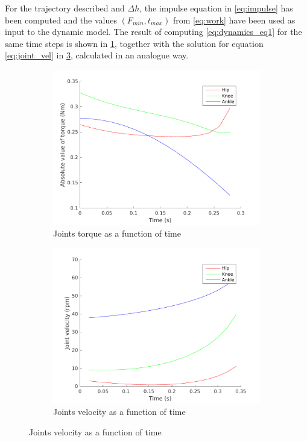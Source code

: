 For the trajectory described and $\Delta h$, the impulse equation in \ref{eq:impulse} has been computed and the values $(F_{min}, t_{max})$ from \ref{eq:work} have been used as input to the dynamic model.
The result of computing \ref{eq:dynamics_eq1} for the same time steps is shown in \ref{fig:controller_torque}, together with the solution for equation \ref{eq:joint_vel} in \ref{fig:controller_speed}, calculated in an analogue way.

\begin{figure}[h]
    \centering
    \begin{subfigure}{0.49\textwidth}
        \includegraphics[width=\textwidth]{figures/torque-time.pdf}
		\caption{Joints torque as a function of time}
		\label{fig:controller_torque}
	\end{subfigure}	
    \begin{subfigure}{0.49\textwidth}
        \includegraphics[width=\textwidth]{figures/speed-time.pdf}
		\caption{Joints velocity as a function of time}
		\label{fig:controller_speed}
    \end{subfigure}
\end{figure}

